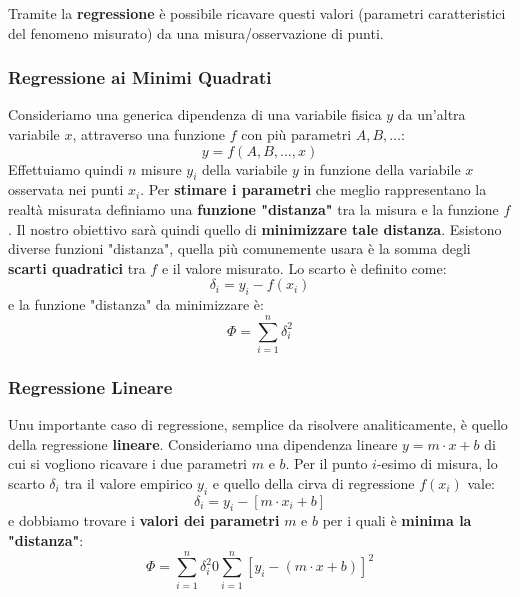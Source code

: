 \documentclass[a4paper,11pt]{report}
\begin{document}
Tramite la \textbf{regressione} è possibile ricavare questi valori (parametri caratteristici del fenomeno misurato) da una misura/osservazione di punti.

\subsubsection{Regressione ai Minimi Quadrati}
Consideriamo una generica dipendenza di una variabile fisica $y$ da un'altra variabile $x$, attraverso una funzione $f$ con più parametri $A,B,\ldots$:
$$
  y = f(A,B,\ldots,x)
$$
Effettuiamo quindi $n$ misure $y_i$ della variabile $y$ in funzione della variabile $x$ osservata nei punti $x_i$. Per \textbf{stimare i parametri} che meglio rappresentano la realtà misurata definiamo una \textbf{funzione "distanza"} tra la misura e la funzione $f$. Il nostro obiettivo sarà quindi quello di \textbf{minimizzare tale distanza}. Esistono diverse funzioni "distanza", quella più comunemente usara è la somma degli \textbf{scarti quadratici} tra $f$ e il valore misurato.
Lo scarto è definito come:
\begin{equation}
  \label{regressione:scarto quadratico}  
    \delta_i = y_i - f(x_i)
\end{equation}
e la funzione "distanza" da minimizzare è:
\begin{equation}
  \label{regressione:funzione quadratica}  
    \Phi = \sum^n_{i=1}\delta_i^2
\end{equation}

\subsubsection{Regressione Lineare}
Unu importante caso di regressione, semplice da risolvere analiticamente, è quello della regressione \textbf{lineare}. Consideriamo una dipendenza lineare $y = m\cdot x+b$ di cui si vogliono ricavare i due parametri $m$ e $b$. Per il punto $i$-esimo di misura, lo scarto $\delta_i$ tra il valore empirico $y_i$ e quello della cirva di regressione $f(x_i)$ vale:
\begin{equation}
  \label{regressione:scarto lineare} 
  \delta_i = y_i - [m\cdot x_i + b]
\end{equation}
e dobbiamo trovare i \textbf{valori dei parametri} $m$ e $b$ per i quali è \textbf{minima la "distanza"}:
\begin{equation}
  \label{regressione:funzione lineare}  
    \Phi = \sum^n_{i=1}\delta_i^2 0 \sum^n_{i=1}[y_i - (m\cdot x+b)]^2
\end{equation}
\end{document}

